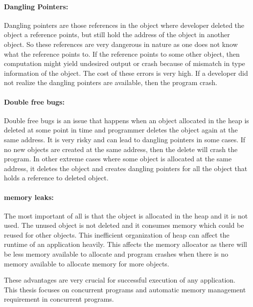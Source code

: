 \paragraph{Dangling Pointers:}
Dangling pointers are those references in
the object where developer deleted the object a reference points, but still hold the address of the object in another object. So these references are very dangerous in nature as one does not know what the reference points to. If the reference points to some other object, then computation might yield undesired output or crash because of mismatch in type information of the object. The cost of these errors is very high. If a developer did not realize the dangling pointers are available, then the program crash.
\paragraph{Double free bugs:}
Double free bugs is an issue that happens when an object allocated in the heap is deleted at some point in time and programmer deletes the object again at the same address. It is very risky and can lead to dangling pointers in some cases. If no new objects are created at the same address, then the delete will crash the program. In other extreme cases where some object is allocated at the same address, it deletes the object and creates dangling pointers for all the object that holds a reference to deleted object. 
\paragraph{memory leaks:}
The most important of all is that the object is allocated in the heap and it is not used. The unused object is not deleted and it consumes memory which could be reused for other objects. This inefficient organization of heap can affect the runtime of an application heavily. This affects the memory allocator as there will be less memory available to allocate and program crashes when there is no memory available to allocate memory for more objects.

These advantages are very crucial for successful execution of any application. This thesis focuses on concurrent programs and automatic memory management requirement in concurrent programs. 

